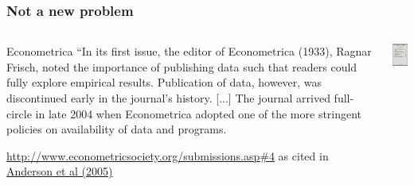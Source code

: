 \begin{frame}
	\frametitle{Not a new problem}
	\begin{columns}
	\begin{column}{.7\textwidth}
	\begin{block}{Econometrica}
		``In its first issue, the editor of Econometrica (1933), Ragnar Frisch, noted
		the importance of publishing data such that readers could fully explore
		empirical results.  Publication of data, however, was discontinued early in
		the journal's history.  [...]  The journal arrived full-circle in late 2004 when Econometrica
		adopted one of the more stringent policies on availability of data and
		programs.
	\end{block}
	\tiny \href{http://www.econometricsociety.org/submissions.asp\#4}{http://www.econometricsociety.org/submissions.asp\#4} as cited in \href{http://research.stlouisfed.org/wp/2005/2005-014.pdf}{Anderson et al (2005)}
	\end{column}
	\begin{column}{.3\textwidth}
\href{http://www.jstor.org/stable/i332704}{\includegraphics[width=\textwidth]{econometrica-vol1.png}}
	\end{column}
\end{columns}
\end{frame}

